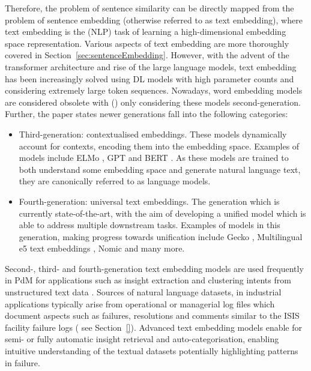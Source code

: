 \documentclass[10pt,oneside]{report}
\begin{document}
Therefore, the problem of sentence similarity can be directly mapped from the problem of sentence embedding (otherwise referred to as text embedding), where text embedding is the (NLP) task of learning a high-dimensional embedding space representation. Various aspects of text embedding are more thoroughly covered in Section~\ref{sec:sentenceEmbedding}. However, with the advent of the transformer architecture \cite{vaswani2017attention} and rise of the large language models, text embedding has been increasingly solved using DL models with high parameter counts \cite{cao2024recent} and considering extremely large token sequences. Nowadays, word embedding models are considered obsolete with (\citet{cao2024recent}) only considering these models second-generation. Further, the paper states newer generations fall into the following categories:
\begin{itemize}
    \item Third-generation: contextualised embeddings. These models dynamically account for contexts, encoding them into the embedding space. Examples of models include ELMo \cite{sarzynska2021detecting}, GPT \cite{radford2018improving} and BERT \cite{devlin2019bert}. As these models are trained to both understand some embedding space and generate natural language text, they are canonically referred to as language models.
    \item Fourth-generation: universal text embeddings. The generation which is currently state-of-the-art, with the aim of developing a unified model which is able to address multiple downstream tasks. Examples of models in this generation, making progress towards unification include Gecko \cite{lee2024gecko}, Multilingual e5 text embeddings \cite{wang2024multilingual}, Nomic \cite{nussbaum2024nomic} and many more. 
\end{itemize}

Second-, third- and fourth-generation text embedding models are used frequently in PdM for applications such as insight extraction \cite{abijith2023large,usuga2022using} and clustering intents from unstructured text data \cite{nota2022text}. Sources of natural language datasets, in industrial applications typically arise from operational or managerial log files which document aspects such as failures, resolutions and comments similar to the ISIS facility failure logs (\cite{todo} see Section~\ref{}). Advanced text embedding models enable for semi- or fully automatic insight retrieval and auto-categorisation, enabling intuitive understanding of the textual datasets potentially highlighting patterns in failure.
\end{document}
